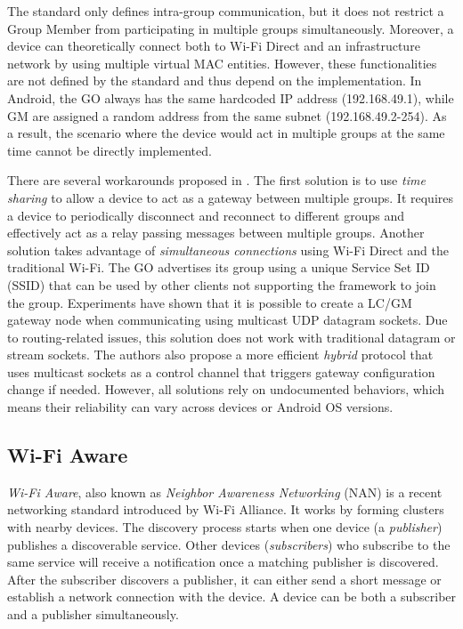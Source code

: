 \documentclass[conference,compsoc]{IEEEtran}
\begin{document}
The standard only defines intra-group communication, but it does not restrict a Group Member from participating in multiple groups simultaneously. Moreover, a device can theoretically connect both to Wi-Fi Direct and an infrastructure network by using multiple virtual MAC entities. However, these functionalities are not defined by the standard and thus depend on the implementation.
In Android, the GO always has the same hardcoded IP address (192.168.49.1), while GM are assigned a random address from the same subnet (192.168.49.2-254). As a result, the scenario where the device would act in multiple groups at the same time cannot be directly implemented. 

There are several workarounds proposed in \cite{FunaiTH16}. The first solution is to use \textit{time sharing} to allow a device to act as a gateway between multiple groups. It requires a device to periodically disconnect and reconnect to different groups and effectively act as a relay passing messages between multiple groups.
Another solution takes advantage of \textit{simultaneous connections} using Wi-Fi Direct and the traditional Wi-Fi. The GO advertises its group using a unique Service Set ID (SSID) that can be used by other clients not supporting the framework to join the group. Experiments have shown that it is possible to create a LC/GM gateway node when communicating using multicast UDP datagram sockets. Due to routing-related issues, this solution does not work with traditional datagram or stream sockets. The authors also propose a more efficient \textit{hybrid} protocol that uses multicast sockets as a control channel that triggers gateway configuration change if needed. However, all solutions rely on undocumented behaviors, which means their reliability can vary across devices or Android OS versions.

\subsection{Wi-Fi Aware}

\textit{Wi-Fi Aware}, also known as \textit{Neighbor Awareness Networking} (NAN) is a recent networking standard introduced by Wi-Fi Alliance. \cite{wifiaware} It works by forming clusters with nearby devices. The discovery process starts when one device (a \textit{publisher}) publishes a discoverable service. Other devices (\textit{subscribers}) who subscribe to the same service will receive a notification once a matching publisher is discovered. After the subscriber discovers a publisher, it can either send a short message or establish a network connection with the device. A device can be both a subscriber and a publisher simultaneously.
\end{document}
